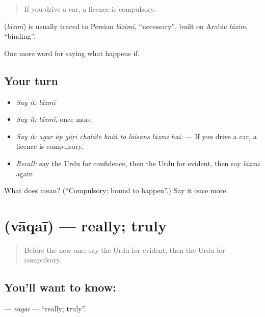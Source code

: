\begin{quote}
If you drive a car, a licence is compulsory.
\end{quote}

\begin{cousinweb}
\textbf{} (\emph{lāzmī}) is usually traced to Persian \emph{lāzimī}, \textquotedblleft{}necessary\textquotedblright{}, built on Arabic \emph{lāzim}, \textquotedblleft{}binding\textquotedblright{}.
\end{cousinweb}

\begin{grammarlens}[title={What you've built}]
One more word for saying what happens if.
\end{grammarlens}

\subsection*{Your turn}
\begin{itemize}
\raggedright
  \item \emph{Say it:} \emph{lāzmī}
  \item \emph{Say it:} \emph{lāzmī}, once more
  \item \emph{Say it:} \emph{agar āp gāṛī chalāte haiṅ to lāisans lāzmī hai.} — If you drive a car, a licence is compulsory.
  \item \emph{Recall:} say the Urdu for confidence, then the Urdu for evident, then say \emph{lāzmī} again
\end{itemize}

\begin{tcolorbox}[breakable,colback=teal!4,colframe=teal!35!black,title={Before you move on}]
What does  mean? (\textquotedblleft{}Compulsory; bound to happen\textquotedblright{}.) Say it once more.
\end{tcolorbox}
\section[\texorpdfstring{\ur{واقعی} (vāqaī)}{واقعی (vāqaī)}]{ (vāqaī) — really; truly}

\label{lesson:UR-C364-vaqai}



\begin{quote}
Before the new one: say the Urdu for evident, then the Urdu for compulsory.
\end{quote}

\subsection*{You'll want to know: }
\textbf{} — \emph{vāqaī} — \textquotedblleft{}really; truly\textquotedblright{}.

